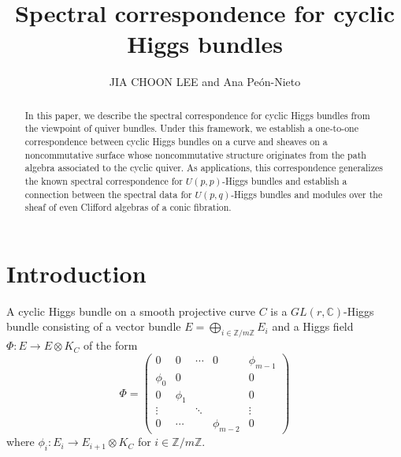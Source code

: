 \documentclass[11pt]{amsart}
\theoremstyle{plain}
\theoremstyle{definition}
\theoremstyle{remark}
\def\C{\mathbb{C}}
\def\zm{\mathbb{Z}/m\mathbb{Z}}
\begin{document}
\title{Spectral correspondence for cyclic Higgs bundles}
\author{JIA CHOON LEE and Ana Pe\'on-Nieto}


\address{Institute of Geometry and Physics, University of Science and Technology of China, 96 Jinzhai Road, Hefei 230026 P.R. China}
\address{Facultad de Ciencias Matemáticas, Universidade de Santiago de Compostela, Rúa de Lope Gómez de Marzoa s/n, 15782 Santiago de Compostela, SPAIN,
      \newline \textit{and}
      \newline\indent School of Mathematics,  University of Birmingham, Watson Building, Edgebaston, Birmingham B15 2TT, UK}





\begin{abstract}
In this paper, we describe the spectral correspondence for cyclic Higgs bundles from the viewpoint of quiver bundles. Under this framework, we establish a one-to-one correspondence between cyclic Higgs bundles on a curve and sheaves on a noncommutative surface whose noncommutative structure originates from the path algebra associated to the cyclic quiver. As applications, this correspondence generalizes the known spectral correspondence for $U(p,p)$-Higgs bundles and establish a connection between the spectral data for $U(p,q)$-Higgs bundles and modules over the sheaf of even Clifford algebras of a conic fibration. 
\end{abstract}

\baselineskip=14.5pt
\maketitle


\setcounter{tocdepth}{1}
\tableofcontents

\section{Introduction}
A cyclic Higgs bundle on a smooth projective curve $C$ is a $GL(r, \C)$-Higgs bundle consisting of a vector bundle $E= \bigoplus_{i\in \zm} E_i$ and a Higgs field $\Phi: E\to E\otimes K_C$ of the form
            \begin{equation}\label{eq:associated bundle}
                \Phi= \begin{pmatrix}
                            0&0&\cdots&0&\phi_{m-1}\\
                            \phi_0&0&&&0\\
                            0&\phi_1&&&0\\
                            \vdots &&\ddots&&\vdots\\
                            0&\cdots&&\phi_{m-2}&0
                \end{pmatrix}
            \end{equation}
where $\phi_i: E_i\to E_{i+1}\otimes K_C$ for $i\in \zm$.
\end{document}
